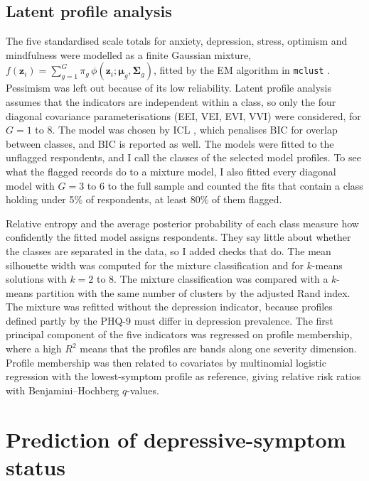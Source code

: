 \subsection{Latent profile analysis}
The five standardised scale totals for anxiety, depression, stress, optimism and mindfulness were modelled as a finite Gaussian mixture, $f(\mathbf{z}_i) = \sum_{g=1}^{G} \pi_g\, \phi(\mathbf{z}_i; \bm\mu_g, \bm\Sigma_g)$, fitted by the EM algorithm in \texttt{mclust} \parencite{scrucca2016}. Pessimism was left out because of its low reliability. Latent profile analysis assumes that the indicators are independent within a class, so only the four diagonal covariance parameterisations (EEI, VEI, EVI, VVI) were considered, for $G = 1$ to 8. The model was chosen by ICL \parencite{biernacki2000}, which penalises BIC for overlap between classes, and BIC is reported as well. The models were fitted to the \GmmN{} unflagged respondents, and I call the classes of the selected model profiles. To see what the flagged records do to a mixture model, I also fitted every diagonal model with $G = 3$ to 6 to the full sample and counted the fits that contain a class holding under 5\% of respondents, at least 80\% of them flagged.

Relative entropy and the average posterior probability of each class measure how confidently the fitted model assigns respondents. They say little about whether the classes are separated in the data, so I added checks that do. The mean silhouette width \parencite{rousseeuw1987} was computed for the mixture classification and for $k$-means solutions with $k = 2$ to 8. The mixture classification was compared with a $k$-means partition with the same number of clusters by the adjusted Rand index. The mixture was refitted without the depression indicator, because profiles defined partly by the PHQ-9 must differ in depression prevalence. The first principal component of the five indicators was regressed on profile membership, where a high $R^2$ means that the profiles are bands along one severity dimension. Profile membership was then related to covariates by multinomial logistic regression with the lowest-symptom profile as reference, giving relative risk ratios with Benjamini--Hochberg $q$-values.

\section{Prediction of depressive-symptom status}\label{sec:ml-design}
